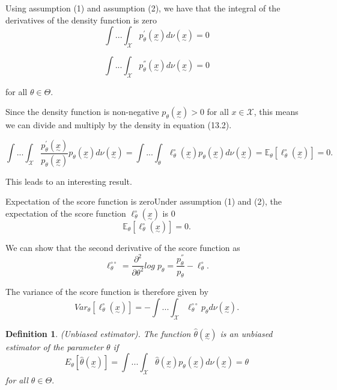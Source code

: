 \documentclass[twoside]{article}
\newtheorem{definition}[theorem]{Definition}
\newcommand{\utilde}{\underset{\sim}}
\begin{document}
Using assumption (1) and assumption (2), we have that the integral of the derivatives of the density function is zero
\begin{equation}
\int...\int_{\mathcal{X}}p_{\theta}^{'}(\utilde{x})d\nu(\utilde{x}) = 0 \tag{13.2}
\end{equation}

\begin{equation}
\int...\int_{\mathcal{X}}p_{\theta}^{''}(\utilde{x})d\nu(\utilde{x}) = 0 \tag{13.3}
\end{equation}

for all $\theta \in \Theta.$

Since the density function is non-negative $p_{\theta}(\utilde{x}) > 0$ for all $x \in \mathcal{X}$, this means we can divide and multiply by the density in equation (13.2).

\begin{equation}
\int ... \int_{\mathcal{X}}\frac{p_{\theta}^{'}(\utilde{x})}{p_{\theta}(\utilde{x})}p_{\theta}(\utilde{x})d\nu(\utilde{x}) = \int ... \int_{\theta}\ell_{\theta}^{\circ}(\utilde{x})p_{\theta}(\utilde{x})d\nu(\utilde{x}) = \mathbb{E}_{\theta}[\ell_{\theta}^{\circ}(\utilde{x})] = 0.
\end{equation}

This leads to an interesting result.

\begin{proposition_exam}{Expectation of the score function is zero}{}Under assumption (1) and (2), the expectation of the score function $\ell_{\theta}^{\circ}(\utilde{x})$ is 0
$$
\mathbb{E}_{\theta}[\ell_{\theta}^{\circ}(\utilde{x})] = 0.
$$
\end{proposition_exam}

We can show that the second derivative of the score function as 
$$
\ell_{\theta}^{\circ \circ} = \frac{\partial^2}{\partial \theta^2}log\;p_{\theta} = \frac{p_{\theta}^{''}}{p_{\theta}} - \ell_{\theta}^{\circ}.
$$

The variance of the score function is therefore given by 
$$
Var_{\theta}[\ell_{\theta}^{\circ}(\utilde{x})] = - \int ... \int_{\mathcal{X}}\ell_{\theta}^{\circ \circ}p_{\theta}d\nu(\utilde{x}).
$$

\begin{definition}(Unbiased estimator). The function $\hat{\theta}(\utilde{x})$ is an unbiased estimator of the parameter $\theta$ if 
$$
E_{\theta}[\hat{\theta}(\utilde{x})] = \int ... \int_{\mathcal{X}}\hat{\theta}(\utilde{x})p_{\theta}(\utilde{x})d\nu(\utilde{x}) = \theta
$$
for all $\theta \in \Theta.$
\end{definition}
\end{document}
